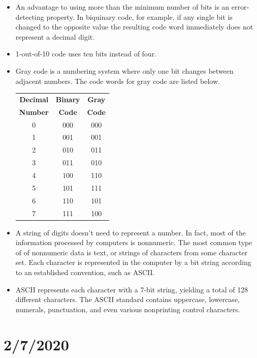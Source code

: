 \documentclass[10pt,a4paper]{article}
\begin{document}
\begin{itemize}
\item An advantage to using more than the minimum number of bits is an error-detecting property. In biquinary code, for example, if any single bit is changed to the opposite value the resulting code word immediately does not represent a decimal digit.
\item 1-out-of-10 code uses ten bits instead of four. 
\item Gray code is a numbering system where only one bit changes between adjacent numbers. The code words for gray code are listed below.\\
\begin{tabular}{|c|c|c|}
\hline 
\textbf{Decimal} & \textbf{Binary} & \textbf{Gray} \\ 
\textbf{Number} & \textbf{Code} & \textbf{Code} \\ 
\hline 
0 & 000 & 000 \\ 
1 & 001 & 001 \\ 
2 & 010 & 011 \\ 
3 & 011 & 010 \\ 
4 & 100 & 110 \\ 
5 & 101 & 111 \\ 
6 & 110 & 101 \\ 
7 & 111 & 100 \\ 
\hline 
\end{tabular} 
\item A string of digits doesn't need to represent a number. In fact, most of the information processed by computers is nonnumeric. The most common type of of nonnumeric data is text, or strings of characters from some character set. Each character is represented in the computer by a bit string according to an established convention, such as ASCII.
\item ASCII represents each character with a 7-bit string, yielding a total of 128 different characters. The ASCII standard contains uppercase, lowercase, numerals, punctuation, and even various nonprinting control characters. 
\end{itemize}
\section{2/7/2020}
\end{document}
